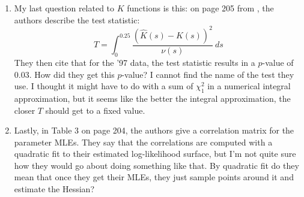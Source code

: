 \documentclass{uwstat572}
\begin{document}
\begin{enumerate}
\item My last question related to $K$ functions is this: on page 205 from \citet{diggle2010}, the authors describe the test statistic:
$$ T = \int_0^{0.25} \frac{(\hat{K}(s) - K(s))^2}{\nu(s)} \ ds $$
They then cite that for the '97 data, the test statistic results in a $p$-value of 0.03.  How did they get this $p$-value?  I cannot find the name of the test they use.  I thought it might have to do with a sum of $\chi_1^2$ in a numerical integral approximation, but it seems like the better the integral approximation, the closer $T$ should get to a fixed value.

\item Lastly, in Table 3 on page 204, the authors give a correlation matrix for the parameter MLEs.  They say that the correlations are computed with a quadratic fit to their estimated log-likelihood surface, but I'm not quite sure how they would go about doing something like that.  By quadratic fit do they mean that once they get their MLEs, they just sample points around it and estimate the Hessian?
\end{enumerate}

%

\end{document}
